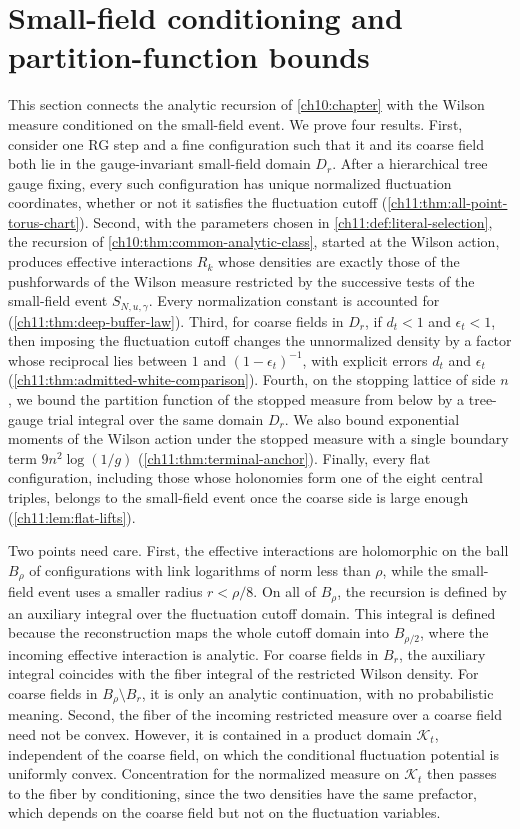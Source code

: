 \chapter{Small-field conditioning and partition-function bounds}\label{ch11:chapter}

This section connects the analytic recursion of \cref{ch10:chapter} with the Wilson measure conditioned on the small-field event. We prove four results. First, consider one RG step and a fine configuration such that it and its coarse field both lie in the gauge-invariant small-field domain $D_r$. After a hierarchical tree gauge fixing, every such configuration has unique normalized fluctuation coordinates, whether or not it satisfies the fluctuation cutoff (\cref{ch11:thm:all-point-torus-chart}). Second, with the parameters chosen in \cref{ch11:def:literal-selection}, the recursion of \cref{ch10:thm:common-analytic-class}, started at the Wilson action, produces effective interactions $R_k$ whose densities are exactly those of the pushforwards of the Wilson measure restricted by the successive tests of the small-field event $S_{N,u,\gamma}$. Every normalization constant is accounted for (\cref{ch11:thm:deep-buffer-law}). Third, for coarse fields in $D_r$, if $d_t<1$ and $\epsilon_t<1$, then imposing the fluctuation cutoff changes the unnormalized density by a factor whose reciprocal lies between $1$ and $(1-\epsilon_t)^{-1}$, with explicit errors $d_t$ and $\epsilon_t$ (\cref{ch11:thm:admitted-white-comparison}). Fourth, on the stopping lattice of side $n$, we bound the partition function of the stopped measure from below by a tree-gauge trial integral over the same domain $D_r$. We also bound exponential moments of the Wilson action under the stopped measure with a single boundary term $9n^2\log(1/g)$ (\cref{ch11:thm:terminal-anchor}). Finally, every flat configuration, including those whose holonomies form one of the eight central triples, belongs to the small-field event once the coarse side is large enough (\cref{ch11:lem:flat-lifts}).

Two points need care. First, the effective interactions are holomorphic on the ball $B_\rho$ of configurations with link logarithms of norm less than $\rho$, while the small-field event uses a smaller radius $r<\rho/8$. On all of $B_\rho$, the recursion is defined by an auxiliary integral over the fluctuation cutoff domain. This integral is defined because the reconstruction maps the whole cutoff domain into $B_{\rho/2}$, where the incoming effective interaction is analytic. For coarse fields in $B_r$, the auxiliary integral coincides with the fiber integral of the restricted Wilson density. For coarse fields in $B_\rho\setminus B_r$, it is only an analytic continuation, with no probabilistic meaning. Second, the fiber of the incoming restricted measure over a coarse field need not be convex. However, it is contained in a product domain $\mathcal K_t$, independent of the coarse field, on which the conditional fluctuation potential is uniformly convex. Concentration for the normalized measure on $\mathcal K_t$ then passes to the fiber by conditioning, since the two densities have the same prefactor, which depends on the coarse field but not on the fluctuation variables.

